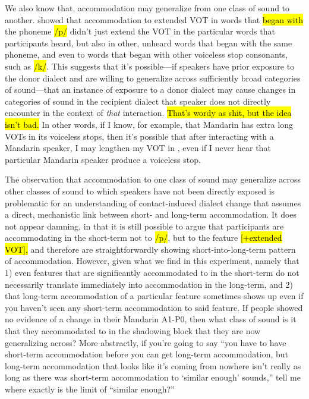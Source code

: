     We also know that, accommodation may generalize from one class of sound to another. \cite{nielsen2008word} showed that accommodation to extended VOT in words that \hl{began with} the phoneme \hl{/p/} didn't just extend the VOT in the particular words that participants heard, but also in other, unheard words that began with the same phoneme, and even to words that began with other voiceless stop consonants, such as \hl{/k/}. This suggests that it's possible---if speakers have prior exposure to the donor dialect and are willing to generalize across sufficiently broad categories of sound---that an instance of exposure to a donor dialect may cause changes in categories of sound in the recipient dialect that speaker does not directly encounter in the context of \emph{that} interaction. \hl{That's wordy as shit, but the idea isn't bad.} In other words, if I know, for example, that Mandarin has extra long VOTs in its voiceless stops, then it's possible that after interacting with a Mandarin speaker, I may lengthen my VOT in \ND{}, even if I never hear that particular Mandarin speaker produce a voiceless stop. %

    The observation that accommodation to one class of sound may generalize across other classes of sound to which speakers have not been directly exposed is problematic for an understanding of contact-induced dialect change that assumes a direct, mechanistic link between short- and long-term accommodation. It does not appear damning, in that it is still possible to argue that participants are accommodating in the short-term not to \hl{/p/}, but to the feature \hl{[+extended VOT],} and therefore are straightforwardly showing short-into-long-term pattern of accommodation. However, given what we find in this experiment, namely that 1) even features that are significantly accommodated to in the short-term do not necessarily translate immediately into accommodation in the long-term, and 2) that long-term accommodation of a particular feature sometimes shows up even if you haven't seen any short-term accommodation to said feature. If people showed no evidence of a change in their Mandarin A1-P0, then what class of sound is it that they accommodated to in the shadowing block that they are now generalizing across? More abstractly, if you're going to say ``you have to have short-term accommodation before you can get long-term accommodation, but long-term accommodation that looks like it's coming from nowhere isn't really as long as there was short-term accommodation to `similar enough' sounds,'' tell me where exactly is the limit of ``similar enough?''

